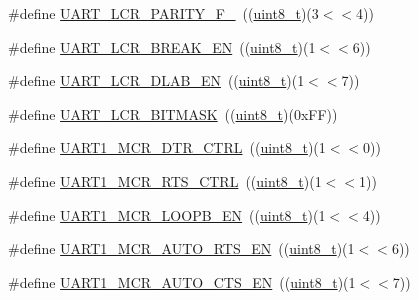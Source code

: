 \begin{DoxyCompactItemize}
\item 
\#define \hyperlink{group___u_a_r_t___private___macros_gaa5d9db8e53dae40ddaa70204fa1b60a3}{U\+A\+R\+T\+\_\+\+L\+C\+R\+\_\+\+P\+A\+R\+I\+T\+Y\+\_\+\+F\+\_}~((\hyperlink{_p_e___types_8h_aba7bc1797add20fe3efdf37ced1182c5}{uint8\+\_\+t})(3$<$$<$4))
\item 
\#define \hyperlink{group___u_a_r_t___private___macros_ga2f83aa82aecd63cf457ea423be643d57}{U\+A\+R\+T\+\_\+\+L\+C\+R\+\_\+\+B\+R\+E\+A\+K\+\_\+\+EN}~((\hyperlink{_p_e___types_8h_aba7bc1797add20fe3efdf37ced1182c5}{uint8\+\_\+t})(1$<$$<$6))
\item 
\#define \hyperlink{group___u_a_r_t___private___macros_gaae9c53e30321d4cac13137c66b022e9e}{U\+A\+R\+T\+\_\+\+L\+C\+R\+\_\+\+D\+L\+A\+B\+\_\+\+EN}~((\hyperlink{_p_e___types_8h_aba7bc1797add20fe3efdf37ced1182c5}{uint8\+\_\+t})(1$<$$<$7))
\item 
\#define \hyperlink{group___u_a_r_t___private___macros_ga28e31fe85eeeb124ff6a471978155356}{U\+A\+R\+T\+\_\+\+L\+C\+R\+\_\+\+B\+I\+T\+M\+A\+SK}~((\hyperlink{_p_e___types_8h_aba7bc1797add20fe3efdf37ced1182c5}{uint8\+\_\+t})(0x\+F\+F))
\item 
\#define \hyperlink{group___u_a_r_t___private___macros_ga8ca301061bda466b0e62ff182938a19e}{U\+A\+R\+T1\+\_\+\+M\+C\+R\+\_\+\+D\+T\+R\+\_\+\+C\+T\+RL}~((\hyperlink{_p_e___types_8h_aba7bc1797add20fe3efdf37ced1182c5}{uint8\+\_\+t})(1$<$$<$0))
\item 
\#define \hyperlink{group___u_a_r_t___private___macros_ga2e84ce056119e87adccff0b8cec560b1}{U\+A\+R\+T1\+\_\+\+M\+C\+R\+\_\+\+R\+T\+S\+\_\+\+C\+T\+RL}~((\hyperlink{_p_e___types_8h_aba7bc1797add20fe3efdf37ced1182c5}{uint8\+\_\+t})(1$<$$<$1))
\item 
\#define \hyperlink{group___u_a_r_t___private___macros_ga2c22f6069fc2d3d621cd8b2e578d69a3}{U\+A\+R\+T1\+\_\+\+M\+C\+R\+\_\+\+L\+O\+O\+P\+B\+\_\+\+EN}~((\hyperlink{_p_e___types_8h_aba7bc1797add20fe3efdf37ced1182c5}{uint8\+\_\+t})(1$<$$<$4))
\item 
\#define \hyperlink{group___u_a_r_t___private___macros_gafe3631c1413e045686f07f3716e0baed}{U\+A\+R\+T1\+\_\+\+M\+C\+R\+\_\+\+A\+U\+T\+O\+\_\+\+R\+T\+S\+\_\+\+EN}~((\hyperlink{_p_e___types_8h_aba7bc1797add20fe3efdf37ced1182c5}{uint8\+\_\+t})(1$<$$<$6))
\item 
\#define \hyperlink{group___u_a_r_t___private___macros_gac7f7f4cc9428e643c0bb4058e7fcb022}{U\+A\+R\+T1\+\_\+\+M\+C\+R\+\_\+\+A\+U\+T\+O\+\_\+\+C\+T\+S\+\_\+\+EN}~((\hyperlink{_p_e___types_8h_aba7bc1797add20fe3efdf37ced1182c5}{uint8\+\_\+t})(1$<$$<$7))

\end{DoxyCompactItemize}

